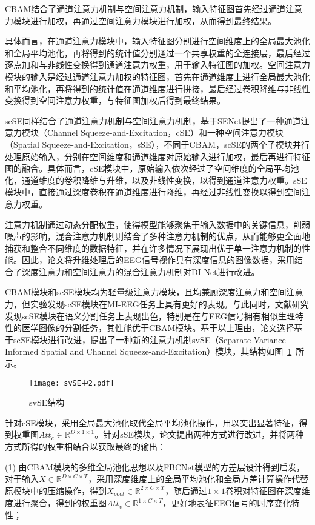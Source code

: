 CBAM结合了通道注意力机制与空间注意力机制，输入特征图首先经过通道注意力模块进行加权，再通过空间注意力模块进行加权，从而得到最终结果。

具体而言，在通道注意力模块中，输入特征图分别进行空间维度上的全局最大池化和全局平均池化，再将得到的统计值分别通过一个共享权重的全连接层，最后经过逐点加和与非线性变换得到通道注意力权重，用于输入特征图的加权。空间注意力模块的输入是经过通道注意力加权的特征图，首先在通道维度上进行全局最大池化和平均池化，再将得到的统计值在通道维度进行拼接，最后经过卷积降维与非线性变换得到空间注意力权重，与特征图加权后得到最终结果。

scSE同样结合了通道注意力机制与空间注意力机制，基于SENet提出了一种通道注意力模块（Channel Squeeze-and-Excitation，cSE）和一种空间注意力模块（Spatial Squeeze-and-Excitation，sSE），不同于CBAM，scSE的两个子模块并行处理原始输入，分别在空间维度和通道维度对原始输入进行加权，最后再进行特征图的融合。具体而言，cSE模块中，原始输入依次经过了空间维度的全局平均池化，通道维度的卷积降维与升维，以及非线性变换，以得到通道注意力权重。sSE模块中，直接通过深度卷积在通道维度进行降维，再经过非线性变换以得到空间注意力权重。

注意力机制通过动态分配权重，使得模型能够聚焦于输入数据中的关键信息，削弱噪声的影响，混合注意力机制则结合了多种注意力机制的优点，从而能够更全面地捕获和整合不同维度的数据特征，并在许多情况下展现出优于单一注意力机制的性能。因此，论文将升维处理后的EEG信号视作具有深度信息的图像数据，采用结合了深度注意力和空间注意力的混合注意力机制对DI-Net进行改进。

CBAM模块和scSE模块均为轻量级注意力模块，且均兼顾深度注意力和空间注意力，但实验发现scSE模块在MI-EEG任务上具有更好的表现。与此同时，文献\cite{roy2018concurrent}研究发现scSE模块在语义分割任务上表现出色，特别是在与EEG信号拥有相似生理特性的医学图像的分割任务，其性能优于CBAM模块。基于以上理由，论文选择基于scSE模块进行改进，提出了一种新的注意力机制svSE（Separate Variance-Informed Spatial and Channel Squeeze-and-Excitation）模块，其结构如图~\ref{fig:svSE}~所示。
\begin{figure}[ht]
    \centering
    \texttt{[image: svSE中2.pdf]}
    \caption{svSE结构}
    \label{fig:svSE}
\end{figure}

针对cSE模块，采用全局最大池化取代全局平均池化操作，用以突出显著特征，得到权重图\(Att_c \in \mathbb{R}^{D \times 1 \times 1}\)。针对sSE模块，论文提出两种方式进行改进，并将两种方式所得的权重相结合以获取最终的输出：

(1) 由CBAM模块的多维全局池化思想以及FBCNet模型的方差层设计\cite{mane2021fbcnet}得到启发，对于输入\(X \in \mathbb{R}^{D \times C \times T}\)，采用深度维度上的全局平均池化和全局方差计算操作代替原模块中的压缩操作，得到\(X_{pool} \in \mathbb{R}^{2 \times C \times T}\)，随后通过\(1\times1\)卷积对特征图在深度维度进行聚合，得到的权重图\(Att_v \in \mathbb{R}^{1 \times C \times T}\)，更好地表征EEG信号的时序变化特性；

